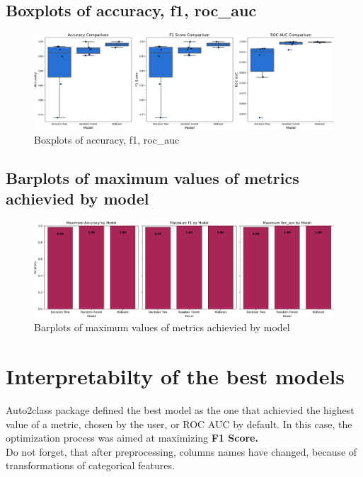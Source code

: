 \documentclass{article}%
\begin{document}
%
\newpage%
\subsection{Boxplots of accuracy, f1, roc\_auc}%
\label{subsec:Boxplotsofaccuracy,f1,rocauc}%


\begin{figure}[h!]%
\centering%
\includegraphics[width=460px]{ModelOptimization/box_plots_metrics.png}%
\caption{Boxplots of accuracy, f1, roc\_auc}%
\end{figure}

%
\subsection{Barplots of maximum values of metrics achievied by model}%
\label{subsec:Barplotsofmaximumvaluesofmetricsachieviedbymodel}%


\begin{figure}[h!]%
\centering%
\includegraphics[width=460px]{ModelOptimization/barplots_max_metric.png}%
\caption{Barplots of maximum values of metrics achievied by model}%
\end{figure}

%
\newpage%
\section{Interpretabilty of the best models}%
\label{sec:Interpretabiltyofthebestmodels}%
Auto2class package defined the best model as the one that achievied the highest value of a metric, chosen by the user, or ROC AUC by default.%
In this case, the optimization process was aimed at maximizing%
\textbf{ F1 Score.}%
\\%
Do not forget, that after preprocessing, columns names have changed, because of transformations of categorical features.%
\end{document}
